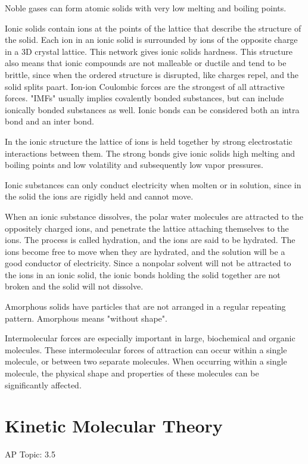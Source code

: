 \documentclass[../chem.tex]{subfiles}
\begin{document}
Noble gases can form atomic solids with very low melting and boiling points.

Ionic solids contain ions at the points of the lattice that describe the structure of the solid. Each ion in an ionic solid is surrounded by ions of the opposite charge in a 3D crystal lattice. 
This network gives ionic solids hardness. This structure also means that ionic compounds are not malleable or ductile and tend to be brittle, since 
when the ordered structure is disrupted, like charges repel, and the solid splits paart. Ion-ion Coulombic forces are the strongest of all attractive forces.
"IMFs" usually implies covalently bonded substances, but can include ionically bonded substances as well. Ionic bonds can be considered both an intra bond and an inter bond.

In the ionic structure the lattice of ions is held together by strong electrostatic interactions between them. The strong bonds give ionic solids high melting and boiling points 
and low volatility and subsequently low vapor pressures.

Ionic substances can only conduct electricity when molten or in solution, since in the solid the ions are rigidly held and cannot move.

When an ionic substance dissolves, the polar water molecules are attracted to the oppositely charged ions, and penetrate the lattice attaching themselves to the ions.
The process is called hydration, and the ions are said to be hydrated. The ions become free to move when they are hydrated, and the solution will be a good conductor of 
electricity. Since a nonpolar solvent will not be attracted to the ions in an ionic solid, the ionic bonds holding the solid together are not broken and the solid will not dissolve.

Amorphous solids have particles that are not arranged in a regular repeating pattern. Amorphous means "without shape".

Intermolecular forces are especially important in large, biochemical and organic molecules. These intermolecular forces of attraction can occur within a single molecule, 
or between two separate molecules. When occurring within a single molecule, the physical shape and properties of these molecules can be significantly affected.
\section{Kinetic Molecular Theory}
AP Topic: 3.5
\end{document}

